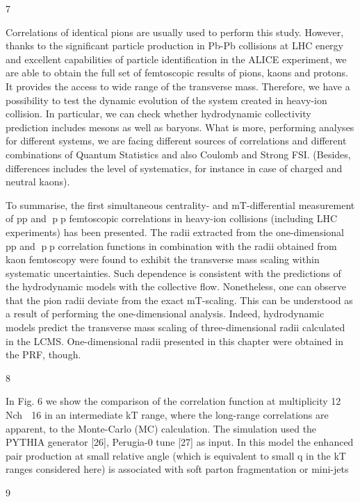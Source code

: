7

Correlations of identical pions are usually used to perform this study. However, thanks to the significant particle production in Pb-Pb collisions at LHC energy  and excellent capabilities of particle identification in the ALICE experiment, we are able to obtain the full set of femtoscopic results of pions, kaons and protons.
It provides the access to wide range of the transverse mass. Therefore, we have a possibility to test the dynamic evolution of the system created in heavy-ion collision. In particular, we can check whether hydrodynamic collectivity prediction includes mesons as well as baryons.
What is more, performing analyses for different systems, we are facing different sources of correlations and different combinations of Quantum Statistics and also Coulomb and Strong FSI. (Besides, differences includes the level of systematics, for instance in case of charged and neutral kaons). 

To summarise, the first simultaneous centrality- and mT-differential measurement
of pp and pp femtoscopic correlations in heavy-ion collisions (including LHC experiments)
has been presented. The radii extracted from the one-dimensional pp
and pp correlation functions in combination with the radii obtained from kaon
femtoscopy were found to exhibit the transverse mass scaling within systematic
uncertainties. Such dependence is consistent with the predictions of the hydrodynamic
models with the collective flow. Nonetheless, one can observe that the
pion radii deviate from the exact mT-scaling. This can be understood as a result
of performing the one-dimensional analysis. Indeed, hydrodynamic models
predict the transverse mass scaling of three-dimensional radii calculated in the
LCMS. One-dimensional radii presented in this chapter were obtained in the PRF,
though.

8

In Fig. 6 we show the comparison of the correlation
function at multiplicity 12  Nch  16 in an intermediate
kT range, where the long-range correlations are apparent,
to the Monte-Carlo (MC) calculation. The simulation used
the PYTHIA generator [26], Perugia-0 tune [27] as input. In
this model the enhanced pair production at small relative
angle (which is equivalent to small q in the kT ranges
considered here) is associated with soft parton fragmentation
or mini-jets

9

